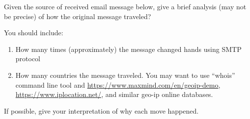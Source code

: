 \documentclass{report}
\begin{document}
\begin{problem}

Given the source of received email message below, give a brief analysis (may not be precise) of how the original message traveled?

You should include:

\begin{enumerate}

\item How many times (approximately) the message changed hands using SMTP protocol

\item How many countries the message traveled.  You may want to use ``whois'' command line tool and \url{https://www.maxmind.com/en/geoip-demo}, \url{https://www.iplocation.net/}, and similar geo-ip online databases.

\end{enumerate}
If possible, give your interpretation of why each move happened.


\end{problem}
\end{document}
